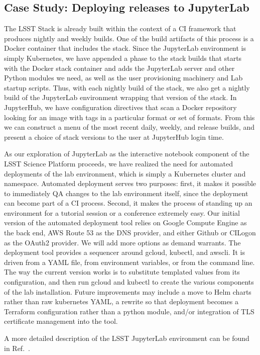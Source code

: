 \subsection{Case Study: Deploying releases to JupyterLab}

The LSST Stack is already built within the context of a CI framework
that produces nightly and weekly builds.  One of the build artifacts of
this process is a Docker container that includes the stack.  Since the
JupyterLab environment is simply Kubernetes, we have appended a phase to
the stack builds that starts with the Docker stack container and adds
the JupyterLab server and other Python modules we need, as well as the
user provisioning machinery and Lab startup scripts.  Thus, with each
nightly build of the stack, we also get a nightly build of the
JupyterLab environment wrapping that version of the stack.  In
JupyterHub, we have configuration directives that scan a Docker
repository looking for an image with tags in a particular format or set
of formats.  From this we can construct a menu of the most recent daily,
weekly, and release builds, and present a choice of stack versions to
the user at JupyterHub login time.

As our exploration of JupyterLab as the interactive notebook component
of the LSST Science Platform\cite{LSE-319} proceeds, we have realized the need for
automated deployments of the lab environment, which is simply a
Kubernetes cluster and namespace.  Automated deployment serves two
purposes: first, it makes it possible to immediately QA changes to the
lab environment itself, since the deployment can become part of a CI
process.  Second, it makes the process of standing up an environment for
a tutorial session or a conference extremely easy.  Our initial version
of the automated deployment tool relies on Google Compute Engine as the
back end, AWS Route 53 as the DNS provider, and either Github or CILogon
as the OAuth2 provider.  We will add more options as demand warrants.
The deployment tool provides a sequencer around gcloud, kubectl, and
awscli.  It is driven from a YAML file, from environment variables, or
from the command line.  The way the current version works is to
substitute templated values from its configuration, and then run gcloud
and kubectl to create the various components of the lab installation.
Future improvements may include a move to Helm charts rather than raw
kubernetes YAML, a rewrite so that deployment becomes a Terraform
configuration rather than a python module, and/or integration of TLS
certificate management into the tool.

A more detailed description of the LSST JupyterLab environment can be found in Ref.~.
